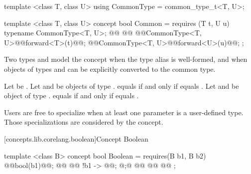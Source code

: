 \begin{addedblock}
%
\begin{itemdecl}
template <class T, class U>
using CommonType = common_type_t<T, U>;

template <class T, class U>
concept bool Common =
  requires (T t, U u) {
    typename CommonType<T, U>;
    @@
    @@
    @\oldtxt{\{}@CommonType<T, U>@\oldtxt{\{}\newtxt{(}@forward<T>(t)@\newtxt{)}\oldtxt{\}\}}@;
    @\oldtxt{\{}@CommonType<T, U>@\oldtxt{\{}\newtxt{(}@forward<U>(u)@\newtxt{)}\oldtxt{\}\}}@;
  };
\end{itemdecl}

\begin{itemdescr}
\pnum
Two types  and  model the  concept when the type
alias  is well-formed, and when objects of types 
and  can be explicitly converted to the common type.

\pnum
Let  be . Let  and  be objects
of type .  equals  if and only if
 equals
. Let  and  be
object of type .  equals  if and only if
 equals
.

\pnum
\enternote Users are free to specialize  when at least one parameter is a
user-defined type. Those specializations are considered by the  concept.\exitnote

\end{itemdescr}

[concepts.lib.corelang.boolean]{Concept Boolean}

%
\begin{itemdecl}
template <class B>
concept bool Boolean =
  requires(B b1, B b2) {
    @\oldtxt{\{ }@bool(b1)@\oldtxt{ \}}@;
    @@
    @@
    { !b1 } -> @@;
    @;@
    @@
    @@
    @@
  };
\end{itemdecl}


\end{addedblock}
